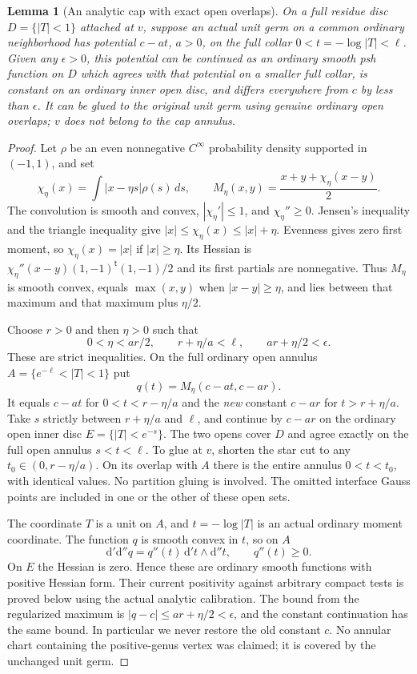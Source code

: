 \documentclass[11pt]{article}
\newtheorem{lemma}[theorem]{Lemma}
\newcommand{\ddc}{\mathrm d'\mathrm d''}
\begin{document}
\begin{lemma}[An analytic cap with exact open overlaps]\label{lem:cap}
On a full residue disc $D=\{|T|<1\}$ attached at $v$, suppose
an actual unit germ on a common ordinary neighborhood has potential
$c-a t$, $a>0$, on the full collar $0<t=-\log|T|<\ell$.
Given any $\epsilon>0$, this potential can be continued as an
ordinary smooth psh function on $D$ which agrees with that potential
on a smaller full collar, is constant on an ordinary inner open
disc, and differs everywhere from $c$ by less than $\epsilon$.
It can be glued to the original unit germ using genuine ordinary
open overlaps; $v$ does not belong to the cap annulus.
\end{lemma}
\begin{proof}
Let $\rho$ be an even nonnegative $C^\infty$ probability density
supported in $(-1,1)$, and set
\[
 \chi_\eta(x)=\int |x-\eta s|\rho(s)\,ds,
 \qquad M_\eta(x,y)=\frac{x+y+\chi_\eta(x-y)}2.
\]
The convolution is smooth and convex, $|\chi_\eta'|\leq1$,
and $\chi_\eta''\geq0$. Jensen's inequality and the triangle
inequality give
$|x|\leq\chi_\eta(x)\leq|x|+\eta$.
Evenness gives zero first moment, so $\chi_\eta(x)=|x|$ if
$|x|\geq\eta$. Its Hessian is
$\chi_\eta''(x-y)(1,-1)^{\mathsf t}(1,-1)/2$ and its first
partials are nonnegative. Thus $M_\eta$ is smooth convex,
equals $\max(x,y)$ when $|x-y|\geq\eta$, and lies between
that maximum and that maximum plus $\eta/2$.

Choose $r>0$ and then $\eta>0$ such that
\[
 0<\eta<ar/2,\qquad r+\eta/a<\ell,
 \qquad ar+\eta/2<\epsilon.
\]
These are strict inequalities. On the full ordinary open annulus
$A=\{e^{-\ell}<|T|<1\}$ put
\[
                 q(t)=M_\eta(c-at,c-ar).
\]
It equals $c-at$ for $0<t<r-\eta/a$ and the \emph{new}
constant $c-ar$ for $t>r+\eta/a$.
Take $s$ strictly between $r+\eta/a$ and $\ell$, and continue
by $c-ar$ on the ordinary open inner disc $E=\{|T|<e^{-s}\}$.
The two opens cover $D$ and agree exactly on the full open annulus
$s<t<\ell$. To glue at $v$, shorten the star cut to any
$t_0\in(0,r-\eta/a)$. On its overlap with $A$ there is the
entire annulus $0<t<t_0$, with identical values. No partition
gluing is involved. The omitted interface Gauss points are
included in one or the other of these open sets.

The coordinate $T$ is a unit on $A$, and $t=-\log|T|$ is
an actual ordinary moment coordinate. The function $q$ is
smooth convex in $t$, so on $A$
\[
                    \ddc q=q''(t)\,\mathrm d't\wedge\mathrm d''t,
                    \qquad q''(t)\geq0.
\]
On $E$ the Hessian is zero. Hence these are ordinary smooth
functions with positive Hessian form. Their current positivity
against arbitrary compact tests is proved below using the actual
analytic calibration. The bound from the regularized maximum is
$|q-c|\leq ar+\eta/2<\epsilon$, and the constant continuation
has the same bound. In particular we never restore the old
constant $c$. No annular chart containing the positive-genus
vertex was claimed; it is covered by the unchanged unit germ.
\end{proof}
\end{document}
